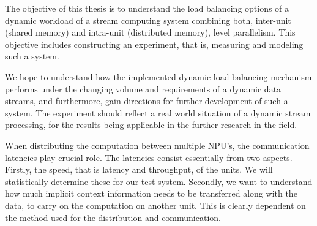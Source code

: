 The objective of this thesis is to understand the load balancing options of a dynamic workload of a stream computing system combining both, inter-unit (shared memory) and intra-unit (distributed memory), level parallelism. This objective includes constructing an experiment, that is, measuring and modeling  such a system.

We hope to understand how the implemented dynamic load balancing mechanism performs under the changing volume and requirements of a dynamic data streams, and furthermore, gain directions for further development of such a system. The experiment should reflect a real world situation of a dynamic stream processing, for the results being applicable in the further research in the field.

When distributing the computation between multiple NPU's, the communication latencies play crucial role. The latencies consist essentially from two aspects. Firstly, the speed, that is latency and throughput, of the units. We will statistically determine these for our test system. Secondly, we want to understand how much implicit context information needs to be transferred along with the data, to carry on the computation on another unit. This is clearly dependent on the method used for the distribution and communication.

